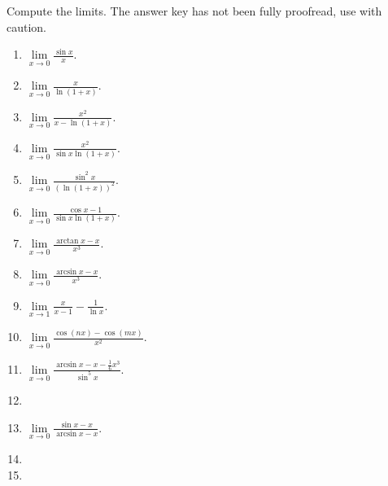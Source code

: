 Compute the limits. The answer key has not been fully proofread, use with caution.
\begin{multicols}{2}
\begin{enumerate}
\item $\displaystyle \lim\limits_{x\to 0} \frac{\sin x  }{x}$. 

\item $\displaystyle \lim\limits_{x\to 0} \frac{x}{\ln (1+x)}$. 

\item $\displaystyle \lim\limits_{x\to 0} \frac{x^2}{x-\ln (1+x)}$. 

\item $\displaystyle \lim\limits_{x\to 0} \frac{x^2}{\sin x\ln (1+x)}$. 

\item $\displaystyle \lim\limits_{x\to 0} \frac{\sin^2 x  }{\left(\ln (1+x)\right)^2}$.

\item $\displaystyle \lim\limits_{x\to 0} \frac{\cos x- 1}{\sin x\ln (1+x)}$.

\item $\displaystyle \lim\limits_{x\to 0} \frac{\arctan x -x}{x^3} $.

\item $\displaystyle \lim\limits_{x\to 0} \frac{\arcsin x -x}{x^3} $.

\item $\displaystyle \lim\limits_{x\to 1} \frac{x}{x-1}-\frac{1}{\ln x}$.

\item $\displaystyle \lim\limits_{x\to 0} \frac{\cos (nx) -\cos (mx)}{x^2 }$.

\item \label{eqProblemLimlixto0(arcsinx-x-x^3/6)/(sin^5 x)}  $\displaystyle \lim \limits_{x\to 0} \frac{\arcsin x-x-\frac{1}{6}x^3}{\sin^5 x} $. 

\item 
\item $\displaystyle \lim\limits_{x\to 0} \frac{\sin x-x }{\arcsin x-x } $.

\item 
\item 

\end{enumerate}
\end{multicols}